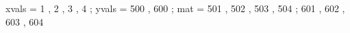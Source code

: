 \begin{functable}
    xvals = 1  , 2  , 3  , 4 ;
    yvals = 500 , 600 ;
    mat   = 501 , 502 , 503 , 504 ;
            601 , 602 , 603 , 604 
\end{functable}
